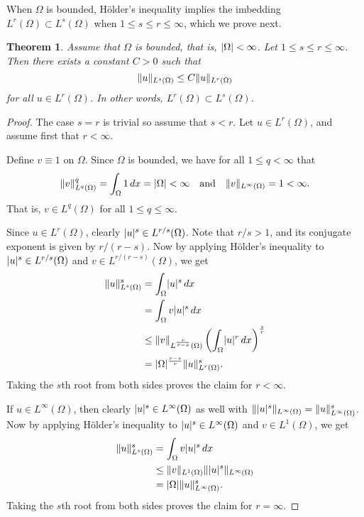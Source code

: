 \documentclass[english, 12pt, a4paper, sci, utf8, a-2b, online]{aaltothesis}
\theoremstyle{definition}
\theoremstyle{plain}
\newtheorem{theorem}{Theorem}[section]
\DeclarePairedDelimiter\abs{\lvert}{\rvert}
\DeclarePairedDelimiter\norm{\lVert}{\rVert}
\newcommand*\diff{\mathop{}\!d}
\numberwithin{equation}{section}
\begin{document}
When $\Omega$ is bounded, Hölder's inequality implies the imbedding
$L^r(\Omega) \subset L^s(\Omega)$ when $1 \leq s \leq r \leq \infty$,
which we prove next.
\begin{theorem}
    \label{thm:lpimbedding}
    Assume that $\Omega$ is bounded, that is, $\abs{\Omega} < \infty$.
    Let $1 \leq s \leq r \leq \infty$.
    Then there exists a constant $C > 0$ such that
    \begin{equation*}
        \norm{u}_{L^s(\Omega)} \leq C \norm{u}_{L^r(\Omega)}
    \end{equation*}
    for all $u \in L^r(\Omega)$. In other words, $L^r(\Omega) \subset L^s(\Omega)$.
\end{theorem}
\begin{proof}
    The case $s = r$ is trivial so assume that $s < r$.
    Let $u \in L^r(\Omega)$, and assume first that $r < \infty$.
    
    Define $v \equiv 1$ on $\Omega$. Since $\Omega$ is bounded, we have
    for all $1 \leq q < \infty$ that
    \begin{equation*}
        \norm{v}_{L^q(\Omega)}^q
        = \int_{\Omega} 1 \diff x
        = \abs{\Omega}
        < \infty
        \quad \text{and} \quad
        \norm{v}_{L^{\infty}(\Omega)} = 1 < \infty.
    \end{equation*}
    That is, $v \in L^q(\Omega)$ for all $1 \leq q \leq \infty$.
    
    Since $u \in L^r(\Omega)$, clearly $\abs{u}^s \in L^{r/s}(\Omega)$.
    Note that $r/s > 1$, and its conjugate exponent is given by
    $r/(r-s)$. Now by applying Hölder's inequality to
    $\abs{u}^s \in L^{r/s}(\Omega)$ and $v \in L^{r/(r-s)}(\Omega)$,
    we get
    \begin{align*}
        \norm{u}_{L^s(\Omega)}^s
        &= \int_{\Omega} \abs{u}^s \diff x \\
        &= \int_{\Omega} v \abs{u}^s \diff x \\
        &\leq \norm{v}_{L^{\frac{r}{r-s}}(\Omega)}
              \left( \int_{\Omega} \abs{u}^r \diff x \right)^{\frac{s}{r}} \\
        &= \abs{\Omega}^{\frac{r-s}{r}} \norm{u}_{L^r(\Omega)}^s.
    \end{align*}
    Taking the $s$th root from both sides proves the claim for $r < \infty$.

    If $u \in L^{\infty}(\Omega)$, then clearly $\abs{u}^s \in L^{\infty}(\Omega)$ as well
    with $\norm{\abs{u}^s}_{L^{\infty}(\Omega)} = \norm{u}_{L^{\infty}(\Omega)}^s$.
    Now by applying Hölder's inequality to
    $\abs{u}^s \in L^{\infty}(\Omega)$ and $v \in L^1(\Omega)$, we get
    \begin{align*}
        \norm{u}_{L^s(\Omega)}^s
        &= \int_{\Omega} v \abs{u}^s \diff x \\
        &\leq \norm{v}_{L^1(\Omega)} \norm{\abs{u}^s}_{L^{\infty}(\Omega)} \\
        &= \abs{\Omega} \norm{u}_{L^{\infty}(\Omega)}^s.
    \end{align*}
    Taking the $s$th root from both sides proves the claim for $r = \infty$.
\end{proof}
\end{document}
